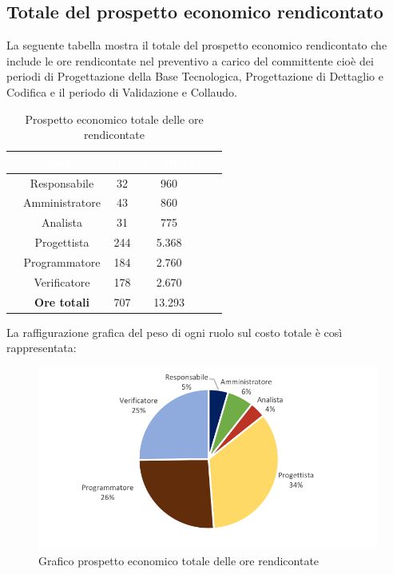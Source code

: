 \subsection{Totale del prospetto economico rendicontato}
La seguente tabella mostra il totale del prospetto economico rendicontato che  include le ore rendicontate nel preventivo a carico del committente cioè dei periodi di Progettazione della Base Tecnologica, Progettazione di Dettaglio e Codifica e il periodo di Validazione e Collaudo.

\begin{table}[ht]
	\begin{center}
		\begin{tabular}{cccccc}
			\rowcolor{coolblack}
			\hline
			&\textcolor{white}{Ruolo}&	\textcolor{white}{Ore} &\textcolor{white}{Costo(\euro)} \\
			\hline
			&Responsabile           &32&960\\
			&Amministratore        & 43& 860 \\
			&Analista                   & 31& 775\\
			&Progettista              &  244& 5.368\\
			&Programmatore       & 184& 2.760 \\
			&Verificatore             & 178& 2.670\\
			\hline
			&\textbf{Ore totali}    &707&13.293\\
		\end{tabular}
		\caption{Prospetto economico totale delle ore rendicontate}
	\end{center}
\end{table}

La raffigurazione grafica del peso di ogni ruolo sul costo totale è così rappresentata:

\begin{figure}[!ht]
	\begin{center}
		\includegraphics[scale=0.90]{images/grafoOreRendicontateEuro.png}
		\caption{Grafico prospetto economico totale delle ore rendicontate}
	\end{center}
\end{figure}


